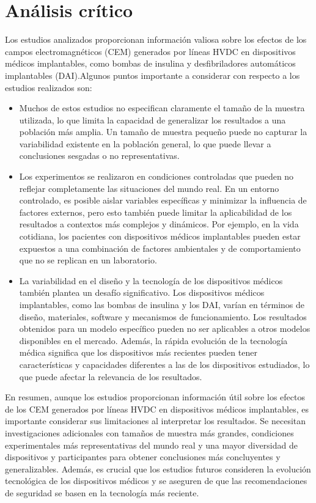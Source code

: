 \section{Análisis crítico}

Los estudios analizados proporcionan información valiosa sobre los efectos de los campos electromagnéticos (CEM) generados por líneas HVDC en dispositivos médicos implantables, como bombas de insulina y desfibriladores automáticos implantables (DAI).Algunos puntos importante a considerar con respecto a los estudios realizados son:
\begin{itemize}
	\item Muchos de estos estudios no especifican claramente el tamaño de la muestra utilizada, lo que limita la capacidad de generalizar los resultados a una población más amplia. Un tamaño de muestra pequeño puede no capturar la variabilidad existente en la población general, lo que puede llevar a conclusiones sesgadas o no representativas.
	\item Los experimentos se realizaron en condiciones controladas que pueden no reflejar completamente las situaciones del mundo real. En un entorno controlado, es posible aislar variables específicas y minimizar la influencia de factores externos, pero esto también puede limitar la aplicabilidad de los resultados a contextos más complejos y dinámicos. Por ejemplo, en la vida cotidiana, los pacientes con dispositivos médicos implantables pueden estar expuestos a una combinación de factores ambientales y de comportamiento que no se replican en un laboratorio.
	\item La variabilidad en el diseño y la tecnología de los dispositivos médicos también plantea un desafío significativo. Los dispositivos médicos implantables, como las bombas de insulina y los DAI, varían en términos de diseño, materiales, software y mecanismos de funcionamiento. Los resultados obtenidos para un modelo específico pueden no ser aplicables a otros modelos disponibles en el mercado. Además, la rápida evolución de la tecnología médica significa que los dispositivos más recientes pueden tener características y capacidades diferentes a las de los dispositivos estudiados, lo que puede afectar la relevancia de los resultados.
\end{itemize}
En resumen, aunque los estudios proporcionan información útil sobre los efectos de los CEM generados por líneas HVDC en dispositivos médicos implantables, es importante considerar sus limitaciones al interpretar los resultados. Se necesitan investigaciones adicionales con tamaños de muestra más grandes, condiciones experimentales más representativas del mundo real y una mayor diversidad de dispositivos y participantes para obtener conclusiones más concluyentes y generalizables. Además, es crucial que los estudios futuros consideren la evolución tecnológica de los dispositivos médicos y se aseguren de que las recomendaciones de seguridad se basen en la tecnología más reciente.

